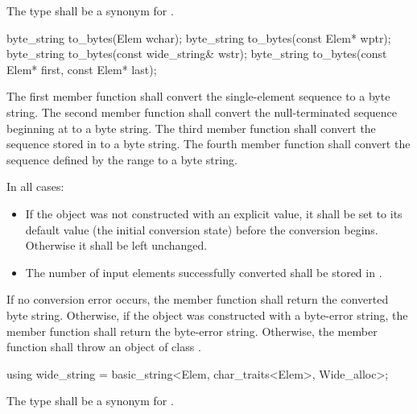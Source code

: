 \begin{itemdescr}
\pnum
The type shall be a synonym for .
\end{itemdescr}

%
\begin{itemdecl}
byte_string to_bytes(Elem wchar);
byte_string to_bytes(const Elem* wptr);
byte_string to_bytes(const wide_string& wstr);
byte_string to_bytes(const Elem* first, const Elem* last);
\end{itemdecl}

\begin{itemdescr}
\pnum
\effects
The first member function shall convert the single-element sequence  to a byte string.
The second member function shall convert the null-terminated sequence beginning at  to
a byte string. The third member function shall convert the sequence stored in  to a
byte string. The fourth member function shall convert the sequence defined by the
range  to a byte string.

\pnum
In all cases:

\begin{itemize}
\item If the  object was not constructed with an explicit value, it
shall be
set to its default value (the initial conversion state) before the
conversion begins. Otherwise it shall be left unchanged.
\item The number of input elements successfully converted shall be stored
in .
\end{itemize}

\pnum
\returns
If no conversion error occurs, the member function shall return the converted byte string.
Otherwise, if the object was constructed with a byte-error string, the
member function shall return the byte-error string.
Otherwise, the member function shall throw an object of class .
\end{itemdescr}

%
\begin{itemdecl}
using wide_string = basic_string<Elem, char_traits<Elem>, Wide_alloc>;
\end{itemdecl}

\begin{itemdescr}
\pnum
The type shall be a synonym for .
\end{itemdescr}

